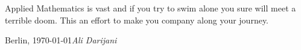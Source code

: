 %
%

\foreword

Applied Mathematics is vast and if you try to swim alone you sure will meet a terrible doom. This an effort to make you
company along your journey.  

\vspace{\baselineskip}
\begin{flushright}\noindent
Berlin, \today \hfill {\it Ali Darijani}\\
\end{flushright}


